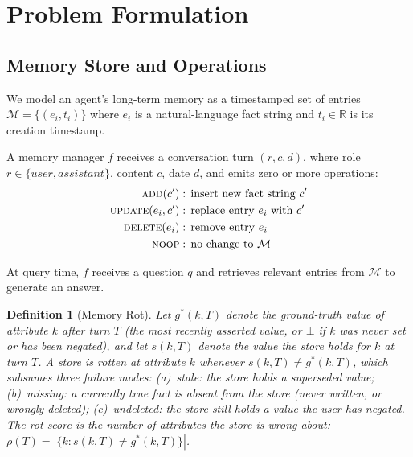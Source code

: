 \documentclass[10pt, twocolumn]{article}
\newtheorem{definition}{Definition}
\begin{document}
\section{Problem Formulation}
\label{sec:problem}

\subsection{Memory Store and Operations}

We model an agent's long-term memory as a timestamped set of entries
$\mathcal{M} = \{(e_i, t_i)\}$ where $e_i$ is a natural-language fact string
and $t_i \in \mathbb{R}$ is its creation timestamp.

A memory manager $f$ receives a conversation turn $(r, c, d)$, where
role $r \in \{\textit{user}, \textit{assistant}\}$, content $c$, date $d$,
and emits zero or more operations:
\begin{align*}
  \textsc{add}(c') &\;\text{: insert new fact string } c'\\
  \textsc{update}(e_i, c') &\;\text{: replace entry } e_i \text{ with } c'\\
  \textsc{delete}(e_i) &\;\text{: remove entry } e_i\\
  \textsc{noop} &\;\text{: no change to } \mathcal{M}
\end{align*}

At query time, $f$ receives a question $q$ and retrieves relevant entries
from $\mathcal{M}$ to generate an answer.

\begin{definition}[Memory Rot]
Let $g^*(k, T)$ denote the ground-truth value of attribute $k$ after turn
$T$ (the most recently asserted value, or $\bot$ if $k$ was never set or has
been negated), and let $s(k, T)$ denote the value the store holds for $k$ at
turn $T$.
A store is \emph{rotten} at attribute $k$ whenever $s(k, T) \neq g^*(k, T)$,
which subsumes three failure modes:
(a)~\emph{stale}: the store holds a superseded value;
(b)~\emph{missing}: a currently true fact is absent from the store (never
written, or wrongly deleted);
(c)~\emph{undeleted}: the store still holds a value the user has negated.
The \emph{rot score} is the number of attributes the store is wrong about:
$\rho(T) = |\{k : s(k, T) \neq g^*(k, T)\}|$.
\end{definition}
\end{document}
